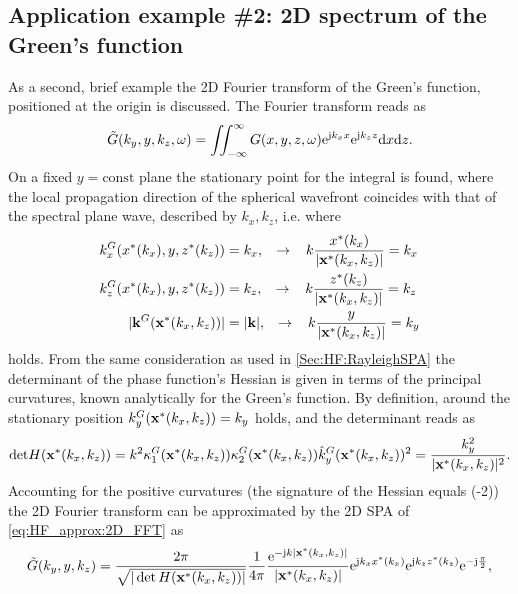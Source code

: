 \subsection*{Application example \#2: 2D spectrum of the Green's function}
\label{Sec:HF_approx:1D_Greens}
As a second, brief example the 2D Fourier transform of the Green's function, positioned at the origin is discussed.
The Fourier transform reads as
\begin{equation}
\label{eq:HF_approx:2D_FFT}
\tilde{G}(k_y,y,k_z,\omega) = \iint^{\infty}_{-\infty} G(x,y,z,\omega) \mathrm{e}^{\mathrm{j} k_x x} \mathrm{e}^{\mathrm{j} k_z z} \mathrm{d} x \mathrm{d} z.
\end{equation}
On a fixed $y = \text{const}$ plane the stationary point for the integral is found, where the local propagation direction of the spherical wavefront coincides with that of the spectral plane wave, described by $k_x, k_z$, i.e. where
\begin{align}
\label{eq:HF_approx:2D_FFT_stat_pos}
k_x^G(x^*(k_x),y,z^*(k_z)) &= k_x, \hspace{3mm} \rightarrow \hspace{3mm} k\frac{x^*(k_x)}{|\mathbf{x}^*(k_x,k_z)|} = k_x \\
k_z^G(x^*(k_x),y,z^*(k_z)) &= k_z, \hspace{3mm} \rightarrow \hspace{3mm} k\frac{z^*(k_z)}{|\mathbf{x}^*(k_x,k_z)|} = k_z \\
|\mathbf{k}^G(\mathbf{x}^*(k_x,k_z))| &= |\mathbf{k}|,  \hspace{3mm} \rightarrow \hspace{3mm} k\frac{y}{|\mathbf{x}^*(k_x,k_z)|} = k_y
\end{align} 
holds.
From the same consideration as used in \ref{Sec:HF:RayleighSPA} the determinant of the phase function's Hessian is given in terms of the principal curvatures, known analytically for the Green's function.
By definition, around the stationary position $k_y^G(\mathbf{x}^*(k_x,k_z)) = k_y$ holds, and the determinant reads as
\begin{equation}
\mathrm{det} H(\mathbf{x}^*(k_x,k_z)) = k^2 \kappa^G_1(\mathbf{x}^*(k_x,k_z))\kappa^G_2(\mathbf{x}^*(k_x,k_z)) \hat{k}^G_y(\mathbf{x}^*(k_x,k_z))^2 = \frac{k_y^2}{|\mathbf{x}^*(k_x,k_z)|^2}.
\end{equation}
Accounting for the positive curvatures (the signature of the Hessian equals (-2)) the 2D Fourier transform can be approximated by the 2D SPA of \eqref{eq:HF_approx:2D_FFT} as
\begin{equation}
\tilde{G}(k_y,y,k_z) = \frac{2\pi}{\sqrt{|\det H(\mathbf{x}^*(k_x,k_z))|}} \frac{1}{4\pi} \frac{\mathrm{e}^{-\mathrm{j} k |\mathbf{x}^*(k_x,k_z)|}}{|\mathbf{x}^*(k_x,k_z)|} \mathrm{e}^{\mathrm{j} k_x x^*(k_x)} \mathrm{e}^{\mathrm{j} k_z z^*(k_z)} \mathrm{e}^{-\mathrm{j} \frac{\pi}{2}},
\end{equation}
